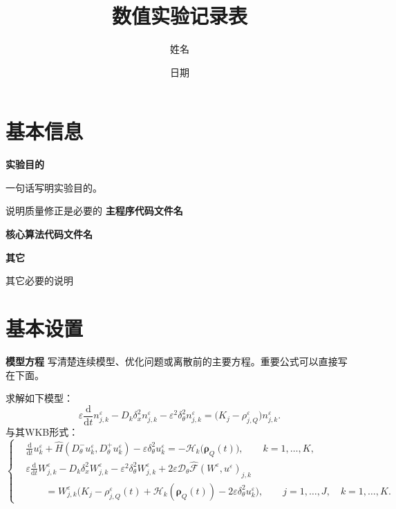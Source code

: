\documentclass[UTF8,a4paper,11pt]{ctexart}
\title{\textbf{数值实验记录表}}
\author{姓名} %
\date{日期} %
\newcommand{\hint}[1]{{\small\color{midgray}#1}\par}
\begin{document}
\maketitle

\section{基本信息}
\noindent\textbf{实验目的}\par \hint{一句话写明实验目的。}
说明质量修正是必要的
\vspace{1.0em}
\noindent\textbf{主程序代码文件名}\par 
\vspace{1.0em}
\noindent\textbf{核心算法代码文件名}\par
\vspace{1.0em}
\noindent\textbf{其它}\par \hint{其它必要的说明}
\vspace{1.0em}



\section{基本设置}

\noindent\textbf{模型方程}
\hint{写清楚连续模型、优化问题或离散前的主要方程。重要公式可以直接写在下面。}
求解如下模型：
\begin{equation}
\label{eq:app_density_compatible_n}
    \varepsilon\frac{\mathrm d}{\mathrm dt}n_{j,k}^\varepsilon
    -
    D_k\delta_x^2 n_{j,k}^\varepsilon
    -
    \varepsilon^2\delta_\theta^2 n_{j,k}^\varepsilon
    =
    \bigl(K_j-\rho_{j,Q}^\varepsilon\bigr)n_{j,k}^\varepsilon .
\end{equation}
与其WKB形式：
\begin{equation}\label{eq:semi_discrete_WKB_system}
\left\{
\begin{aligned}
&\frac{\mathrm d}{\mathrm dt}u_k^\varepsilon
+
\widehat H
\left(
D_\theta^-u_k^\varepsilon,
D_\theta^+u_k^\varepsilon
\right)
-
\varepsilon\delta_\theta^2u_k^\varepsilon
=
-\mathcal H_k\bigl(\boldsymbol\rho_Q(t)\bigr),
\qquad
k=1,\dots,K,
\\[1mm]
&\varepsilon
\frac{\mathrm d}{\mathrm dt}W_{j,k}^\varepsilon
-
D_k\delta_x^2W_{j,k}^\varepsilon
-
\varepsilon^2\delta_\theta^2W_{j,k}^\varepsilon
+
2\varepsilon
\mathcal D_\theta
\widehat{\mathcal F}(W^\varepsilon,u^\varepsilon)_{j,k}
\\
&\qquad =
W_{j,k}^\varepsilon
\bigl(
K_j-\rho_{j,Q}^\varepsilon(t)
+\mathcal H_k(\boldsymbol\rho_Q(t))
-2\varepsilon\delta_\theta^2u_k^\varepsilon
\bigr),
\qquad
j=1,\dots,J,\quad k=1,\dots,K .
\end{aligned}
\right.
\end{equation}
\end{document}
